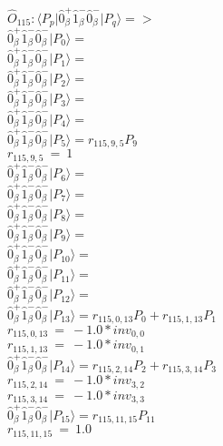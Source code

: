 \documentclass[14pt]{article}
\begin{document}
    $\hat{O}_{115}:  \langle{P_p}\vert \hat{0}_{\beta}^{+}\hat{1}_{\beta}^{-}\hat{0}_{\beta}^{-} \vert{P_q}\rangle => $ \\ 
    $ \hat{0}_{\beta}^{+}\hat{1}_{\beta}^{-}\hat{0}_{\beta}^{-} \vert{P_{0}}\rangle =  $ \\ 
    $ \hat{0}_{\beta}^{+}\hat{1}_{\beta}^{-}\hat{0}_{\beta}^{-} \vert{P_{1}}\rangle =  $ \\ 
    $ \hat{0}_{\beta}^{+}\hat{1}_{\beta}^{-}\hat{0}_{\beta}^{-} \vert{P_{2}}\rangle =  $ \\ 
    $ \hat{0}_{\beta}^{+}\hat{1}_{\beta}^{-}\hat{0}_{\beta}^{-} \vert{P_{3}}\rangle =  $ \\ 
    $ \hat{0}_{\beta}^{+}\hat{1}_{\beta}^{-}\hat{0}_{\beta}^{-} \vert{P_{4}}\rangle =  $ \\ 
    $ \hat{0}_{\beta}^{+}\hat{1}_{\beta}^{-}\hat{0}_{\beta}^{-} \vert{P_{5}}\rangle = {r}_{115,9,5}P_{9} $ \\ 
    ${r}_{115,9,5}\ =\ 1 $ \\ 
    $ \hat{0}_{\beta}^{+}\hat{1}_{\beta}^{-}\hat{0}_{\beta}^{-} \vert{P_{6}}\rangle =  $ \\ 
    $ \hat{0}_{\beta}^{+}\hat{1}_{\beta}^{-}\hat{0}_{\beta}^{-} \vert{P_{7}}\rangle =  $ \\ 
    $ \hat{0}_{\beta}^{+}\hat{1}_{\beta}^{-}\hat{0}_{\beta}^{-} \vert{P_{8}}\rangle =  $ \\ 
    $ \hat{0}_{\beta}^{+}\hat{1}_{\beta}^{-}\hat{0}_{\beta}^{-} \vert{P_{9}}\rangle =  $ \\ 
    $ \hat{0}_{\beta}^{+}\hat{1}_{\beta}^{-}\hat{0}_{\beta}^{-} \vert{P_{10}}\rangle =  $ \\ 
    $ \hat{0}_{\beta}^{+}\hat{1}_{\beta}^{-}\hat{0}_{\beta}^{-} \vert{P_{11}}\rangle =  $ \\ 
    $ \hat{0}_{\beta}^{+}\hat{1}_{\beta}^{-}\hat{0}_{\beta}^{-} \vert{P_{12}}\rangle =  $ \\ 
    $ \hat{0}_{\beta}^{+}\hat{1}_{\beta}^{-}\hat{0}_{\beta}^{-} \vert{P_{13}}\rangle = {r}_{115,0,13}P_{0}+{r}_{115,1,13}P_{1} $ \\ 
    ${r}_{115,0,13}\ =\ -1.0*{inv}_{0,0} $ \\ 
    ${r}_{115,1,13}\ =\ -1.0*{inv}_{0,1} $ \\ 
    $ \hat{0}_{\beta}^{+}\hat{1}_{\beta}^{-}\hat{0}_{\beta}^{-} \vert{P_{14}}\rangle = {r}_{115,2,14}P_{2}+{r}_{115,3,14}P_{3} $ \\ 
    ${r}_{115,2,14}\ =\ -1.0*{inv}_{3,2} $ \\ 
    ${r}_{115,3,14}\ =\ -1.0*{inv}_{3,3} $ \\ 
    $ \hat{0}_{\beta}^{+}\hat{1}_{\beta}^{-}\hat{0}_{\beta}^{-} \vert{P_{15}}\rangle = {r}_{115,11,15}P_{11} $ \\ 
    ${r}_{115,11,15}\ =\ 1.0 $ \\ 
    
\end{document}
